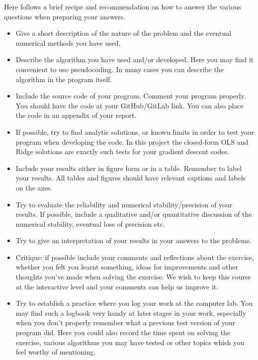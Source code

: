 \documentclass[11pt,a4paper]{article}
\begin{document}
Here follows a brief recipe and recommendation on how to answer the various
questions when preparing your answers.
\begin{itemize}[nosep]
  \item Give a short description of the nature of the problem and the
        eventual numerical methods you have used.
  \item Describe the algorithm you have used and/or developed.  Here you may
        find it convenient to use pseudocoding.  In many cases you can
        describe the algorithm in the program itself.
  \item Include the source code of your program.  Comment your program
        properly.  You should have the code at your GitHub/GitLab link.  You
        can also place the code in an appendix of your report.
  \item If possible, try to find analytic solutions, or known limits in order
        to test your program when developing the code.  In this project the
        closed-form OLS and Ridge solutions are exactly such tests for your
        gradient descent codes.
  \item Include your results either in figure form or in a table.  Remember
        to label your results.  All tables and figures should have relevant
        captions and labels on the axes.
  \item Try to evaluate the reliability and numerical stability/precision of
        your results.  If possible, include a qualitative and/or quantitative
        discussion of the numerical stability, eventual loss of precision
        etc.
  \item Try to give an interpretation of your results in your answers to the
        problems.
  \item Critique: if possible include your comments and reflections about the
        exercise, whether you felt you learnt something, ideas for
        improvements and other thoughts you've made when solving the
        exercise.  We wish to keep this course at the interactive level and
        your comments can help us improve it.
  \item Try to establish a practice where you log your work at the computer
        lab.  You may find such a logbook very handy at later stages in your
        work, especially when you don't properly remember what a previous
        test version of your program did.  Here you could also record the
        time spent on solving the exercise, various algorithms you may have
        tested or other topics which you feel worthy of mentioning.
\end{itemize}
\end{document}
